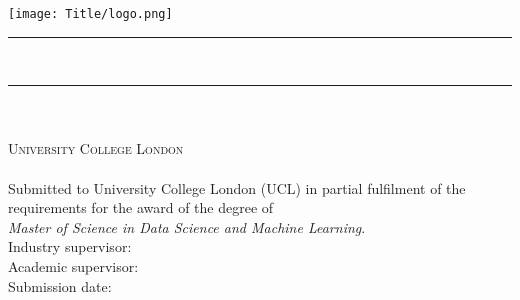 \begin{singlespace}
    \begin{titlepage}
        \center{}
        \texttt{[image: Title/logo.png]} \vspace{0.5cm}

        \rule{\linewidth}{0.5mm} \\[0.4cm]
            { \begin{spacing}{1}
            	\huge \bfseries \textsc{\thesisTitle}
              \end{spacing}}
        \rule{\linewidth}{0.5mm} \\[1.5cm]

        \LARGE \textbf{\textsc{\authorName}}\\
        \textsc{\Large University College London}\\
        \textsc{\Large \department}\\[2cm]

        {\large Submitted to University College London (UCL) in partial fulfilment of the requirements for the award of the degree of \\ \textit{Master of Science in Data Science and Machine Learning}.}\\[2cm]

        {\large Industry supervisor: \primarySupervisor}\\
        {\large Academic supervisor: \secondarySupervisor}\\[2cm]

        {\large Submission date: \submissionDate}
    \end{titlepage}
\end{singlespace}

%


